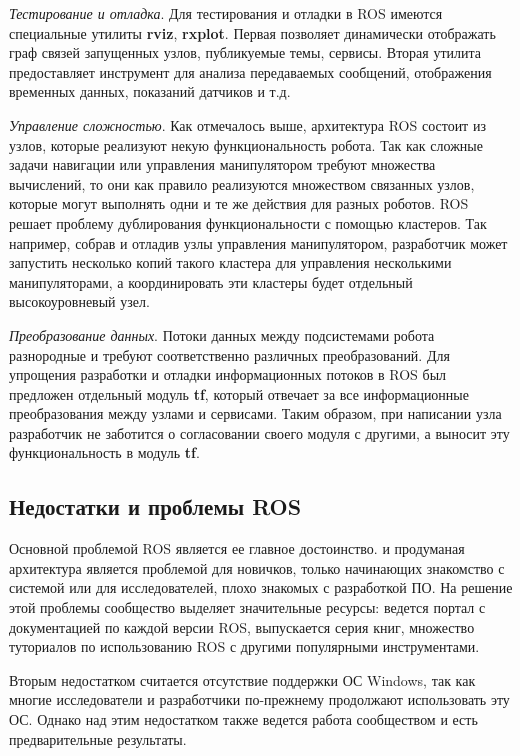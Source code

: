 \documentclass[10pt, a5paper]{article}
\begin{document}
\emph{Тестирование и отладка}. Для тестирования и отладки в ROS имеются специальные утилиты \textbf{rviz}, \textbf{rxplot}. Первая позволяет динамически отображать граф связей запущенных узлов, публикуемые темы, сервисы. Вторая утилита предоставляет инструмент для анализа передаваемых сообщений, отображения временных данных, показаний датчиков и т.д.

\emph{Управление сложностью}. Как отмечалось выше, архитектура ROS состоит из узлов, которые реализуют некую функциональность робота. Так как сложные задачи навигации или управления манипулятором требуют множества вычислений, то они как правило реализуются множеством связанных узлов, которые могут выполнять одни и те же действия для разных роботов. ROS решает проблему дублирования функциональности с помощью кластеров. Так например, собрав и отладив узлы управления манипулятором, разработчик может запустить несколько копий такого кластера для управления несколькими манипуляторами, а координировать эти кластеры будет отдельный высокоуровневый узел.

\emph{Преобразование данных}. Потоки данных между подсистемами робота разнородные и требуют соответственно различных преобразований. Для упрощения разработки и отладки информационных потоков в ROS был предложен отдельный модуль \textbf{tf}, который отвечает за все информационные преобразования между узлами и сервисами. Таким образом, при написании узла разработчик не заботится о согласовании своего модуля с другими, а выносит эту функциональность в модуль \textbf{tf}.

\subsection*{Недостатки и проблемы ROS}

Основной проблемой ROS является ее главное достоинство. \linebreak  и продуманая архитектура является проблемой для новичков, только начинающих знакомство с системой или для исследователей, плохо знакомых с разработкой ПО. На решение этой проблемы сообщество выделяет значительные ресурсы: ведется портал с документацией по каждой версии ROS, выпускается серия книг, множество туториалов по использованию ROS с другими популярными инструментами.

Вторым недостатком считается отсутствие поддержки ОС \linebreak Windows, так как многие исследователи и разработчики по-прежнему продолжают использовать эту ОС. Однако над этим недостатком также ведется работа сообществом и есть предварительные результаты.
\end{document}
